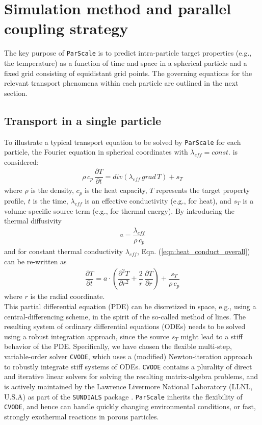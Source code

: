 \documentclass{particles2015}
\begin{document}
\section{Simulation method and parallel coupling strategy}
\label{sec:simu_method}
The key purpose of \texttt{ParScale} is to predict intra-particle target properties (e.g., the temperature) as a function of time and space in a spherical particle and a fixed grid consisting of equidistant grid points. The governing equations for the relevant transport phenomena within each particle are outlined in the next section.

\subsection{Transport in a single particle}
To illustrate a typical transport equation to be solved by \texttt{ParScale} for each particle, the Fourier equation in spherical coordinates with $\lambda_{eff} = const.$ is considered:
\begin{align}
\rho \, c_p \, \dfrac{\partial T}{\partial t} = div (\lambda_{eff}\, grad\,T) + s_T
\label{eqn:heat_conduct_overall}
\end{align}
where $\rho$ is the density, $c_p$ is the heat capacity, $T$ represents the target property profile, $t$ is the time, $\lambda_{eff}$ is an effective conductivity (e.g., for heat), and $s_T$ is a volume-specific source term (e.g., for thermal energy). By introducing the thermal diffusivity 
\begin{align}
a = \dfrac{\lambda_{eff}}{\rho \, c_p}
\end{align}
and for constant thermal conductivity $\lambda_{eff}$, Eqn. (\ref{eqn:heat_conduct_overall}) can be re-written as
\begin{align}
 \dfrac{\partial T}{\partial t} =  a \cdot \left( \dfrac{\partial^2 T}{\partial r^2} + \dfrac{2}{r} \, \dfrac{\partial T}{\partial r} \right) + \dfrac{s_T}{\rho \, c_p}
\label{eqn:heatconductradial}
\end{align}
where $r$ is the radial coordinate.  \\
This partial differential equation (PDE) can be discretized in space, e.g., using a central-differencing scheme, in the spirit of the so-called method of lines. The resulting system of ordinary differential equations (ODEs) needs to be solved using a robust integration approach, since the source $s_T$ might lead to a stiff behavior of the PDE. Specifically, we have chosen the flexible multi-step, variable-order solver \texttt{CVODE}, which uses a (modified) Newton-iteration approach to robustly integrate stiff systems of ODEs. \texttt{CVODE} contains a plurality of direct and iterative linear solvers for solving the resulting matrix-algebra problems, and is actively maintained by the Lawrence Livermore National Laboratory (LLNL, U.S.A) as part of the \texttt{SUNDIALS} package  \cite{Cohen1996}. \texttt{ParScale} inherits the flexibility of \texttt{CVODE}, and hence can handle quickly changing environmental conditions, or fast, strongly exothermal reactions in porous particles. \\
\end{document}
